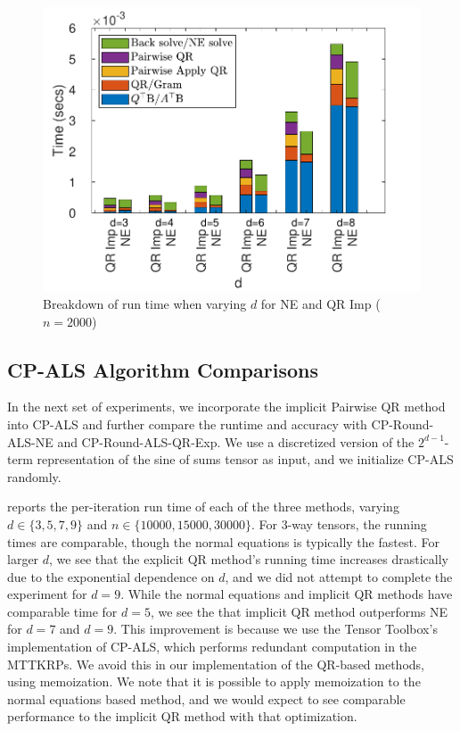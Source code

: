\documentclass{article}
\begin{document}
\begin{figure}[ht!]
  \begin{center}
    \includegraphics[scale = 0.8]{breakdown_p.pdf}
    \caption[Figure]{Breakdown of run time when varying $d$ for NE and QR Imp ($n=2000$) \label{fig:LS_problem_breakdown}}
  \end{center}
\end{figure}

\subsection{CP-ALS Algorithm Comparisons}

In the next set of experiments, we incorporate the implicit Pairwise QR method into CP-ALS and further compare the runtime and accuracy with CP-Round-ALS-NE and CP-Round-ALS-QR-Exp. 
We use a discretized version of the $2^{d-1}$-term representation of the sine of sums tensor as input, and we initialize CP-ALS randomly.

 reports the per-iteration run time of each of the three methods, varying $d\in\{3,5,7,9\}$ and $n \in \{10000,15000,30000\}$.
For 3-way tensors, the running times are comparable, though the normal equations is typically the fastest.
For larger $d$, we see that the explicit QR method's running time increases drastically due to the exponential dependence on $d$, and we did not attempt to complete the experiment for $d=9$.
While the normal equations and implicit QR methods have comparable time for $d=5$, we see the that implicit QR method outperforms NE for $d=7$ and $d=9$.
This improvement is because we use the Tensor Toolbox's implementation of CP-ALS, which performs redundant computation in the MTTKRPs.
We avoid this in our implementation of the QR-based methods, using memoization.
We note that it is possible to apply memoization to the normal equations based method, and we would expect to see comparable performance to the implicit QR method with that optimization.
\end{document}
